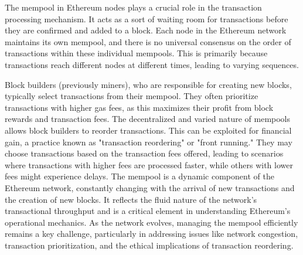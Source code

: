 The mempool in Ethereum nodes plays a crucial role in the transaction processing mechanism. It acts as a sort of waiting room for transactions before they are confirmed and added to a block. Each node in the Ethereum network maintains its own mempool, and there is no universal consensus on the order of transactions within these individual mempools. This is primarily because transactions reach different nodes at different times, leading to varying sequences.

Block builders (previously miners), who are responsible for creating new blocks, typically select transactions from their mempool. They often prioritize transactions with higher gas fees, as this maximizes their profit from block rewards and transaction fees. The decentralized and varied nature of mempools allows block builders to reorder transactions. This can be exploited for financial gain, a practice known as "transaction reordering" or "front running." They may choose transactions based on the transaction fees offered, leading to scenarios where transactions with higher fees are processed faster, while others with lower fees might experience delays.
The mempool is a dynamic component of the Ethereum network, constantly changing with the arrival of new transactions and the creation of new blocks. It reflects the fluid nature of the network’s transactional throughput and is a critical element in understanding Ethereum's operational mechanics. As the network evolves, managing the mempool efficiently remains a key challenge, particularly in addressing issues like network congestion, transaction prioritization, and the ethical implications of transaction reordering.